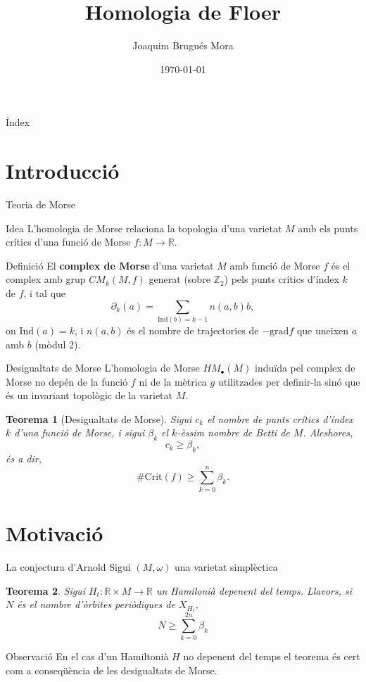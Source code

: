 \documentclass{beamer}
\title{Homologia de Floer}
\author{Joaquim Brugués Mora}
\institute{Facultat de Matemàtiques i Estadística\\ UPC}
\date{\today}
\newcommand{\con}[1]{\mathbb{#1}}
\newcommand{\R}{\con{R}}
\newtheorem{teorema}{Teorema}
\begin{document}
\begin{frame}
	\titlepage
\end{frame}

\begin{frame}{Índex}
	\tableofcontents
\end{frame}

\section{Introducció}

\begin{frame}{Teoria de Morse}
	\begin{block}{Idea}
		L'homologia de Morse relaciona la topologia d'una varietat $M$ amb els punts crítics d'una funció de Morse $f: M \rightarrow \R$.
	\end{block}

	\begin{block}{Definició}
		El {\bf complex de Morse} d'una varietat $M$ amb funció de Morse $f$ és el complex amb grup $CM_k(M,f)$ generat (sobre $\con{Z}_2$) pels punts crítics d'índex $k$ de $f$, i tal que
		\[\partial_k(a) = \sum_{\mathrm{Ind}(b) = k-1} n(a,b) b ,\]
		on $\mathrm{Ind}(a) = k$, i $n(a,b)$ és el nombre de trajectories de $-\mathrm{grad}f$ que uneixen $a$ amb $b$ (mòdul 2).
	\end{block}
\end{frame}

\begin{frame}{Desigualtats de Morse}
	L'homologia de Morse $HM_{\bullet}(M)$ induïda pel complex de Morse no depén de la funció $f$ ni de la mètrica $g$ utilitzades per definir-la sinó que és un invariant topològic de la varietat $M$.

	\begin{teorema}[Desigualtats de Morse]
		Sigui $c_k$ el nombre de punts crítics d'índex $k$ d'una funció de Morse, i sigui $\beta_k$ el $k$-èssim nombre de Betti de $M$. Aleshores,
		\[c_k \geq \beta_k ,\]
		és a dir,
		\[\# \mathrm{Crit}(f) \geq \sum_{k=0}^n \beta_k .\]
	\end{teorema}
\end{frame}

\section{Motivació}

\begin{frame}{La conjectura d'Arnold}
	Sigui $(M,\omega)$ una varietat simplèctica

	\begin{teorema}
		Sigui $H_t : \R \times M \rightarrow \R$ un Hamilonià depenent del temps. Llavors, si $N$ és el nombre d'òrbites periòdiques de $X_{H_t}$,
		\[N \geq \sum_{k=0}^{2n} \beta_k\]
	\end{teorema}

	\begin{block}{Observació}
		En el cas d'un Hamiltonià $H$ no depenent del temps el teorema és cert com a conseqüència de les desigualtats de Morse.
	\end{block}
\end{frame}
\end{document}
